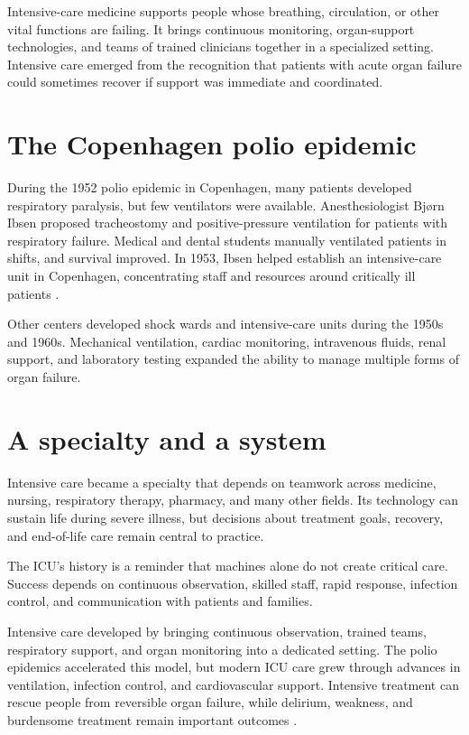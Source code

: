 \documentclass[12pt,oneside]{book}
\begin{document}
Intensive-care medicine supports people whose breathing, circulation, or other
vital functions are failing. It brings continuous monitoring, organ-support
technologies, and teams of trained clinicians together in a specialized
setting. Intensive care emerged from the recognition that patients with acute
organ failure could sometimes recover if support was immediate and
coordinated.

\section{The Copenhagen polio epidemic}
During the 1952 polio epidemic in Copenhagen, many patients developed respiratory paralysis, but few ventilators were available. Anesthesiologist Bjørn Ibsen proposed tracheostomy and positive-pressure ventilation for patients with respiratory failure. Medical and dental students manually ventilated patients in shifts, and survival improved. In 1953, Ibsen helped establish an intensive-care unit in Copenhagen, concentrating staff and resources around critically ill patients \cite{icuHistory,ibsenRecords}.

Other centers developed shock wards and intensive-care units during the 1950s
and 1960s. Mechanical ventilation, cardiac monitoring, intravenous fluids,
renal support, and laboratory testing expanded the ability to manage multiple
forms of organ failure.

\section{A specialty and a system}
Intensive care became a specialty that depends on teamwork across medicine, nursing, respiratory therapy, pharmacy, and many other fields. Its technology can sustain life during severe illness, but decisions about treatment goals, recovery, and end-of-life care remain central to practice.

The ICU's history is a reminder that machines alone do not create critical
care. Success depends on continuous observation, skilled staff, rapid
response, infection control, and communication with patients and families.

Intensive care developed by bringing continuous observation, trained teams,
respiratory support, and organ monitoring into a dedicated setting. The polio
epidemics accelerated this model, but modern ICU care grew through advances in
ventilation, infection control, and cardiovascular support. Intensive
treatment can rescue people from reversible organ failure, while delirium,
weakness, and burdensome treatment remain important outcomes
\cite{icuHistory,ibsenRecords}.
\end{document}
